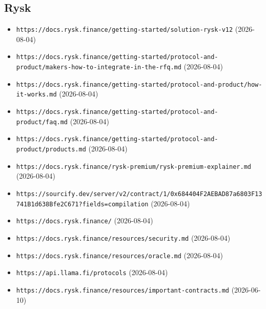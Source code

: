 \subsection*{Rysk}
\begin{itemize}\setlength{\itemsep}{0pt}\small
\item \texttt{https://docs.rysk.finance/getting-started/solution-rysk-v12} (2026-08-04)
\item \texttt{https://docs.rysk.finance/getting-started/protocol-and-product/makers-how-to-integrate-in-the-rfq.md} (2026-08-04)
\item \texttt{https://docs.rysk.finance/getting-started/protocol-and-product/how-it-works.md} (2026-08-04)
\item \texttt{https://docs.rysk.finance/getting-started/protocol-and-product/faq.md} (2026-08-04)
\item \texttt{https://docs.rysk.finance/getting-started/protocol-and-product/products.md} (2026-08-04)
\item \texttt{https://docs.rysk.finance/rysk-premium/rysk-premium-explainer.md} (2026-08-04)
\item \texttt{https://sourcify.dev/server/v2/contract/1/0x684404F2AEBAD87a6803F13741B1d638Bfe2C671?fields=compilation} (2026-08-04)
\item \texttt{https://docs.rysk.finance/} (2026-08-04)
\item \texttt{https://docs.rysk.finance/resources/security.md} (2026-08-04)
\item \texttt{https://docs.rysk.finance/resources/oracle.md} (2026-08-04)
\item \texttt{https://api.llama.fi/protocols} (2026-08-04)
\item \texttt{https://docs.rysk.finance/resources/important-contracts.md} (2026-06-10)
\end{itemize}

